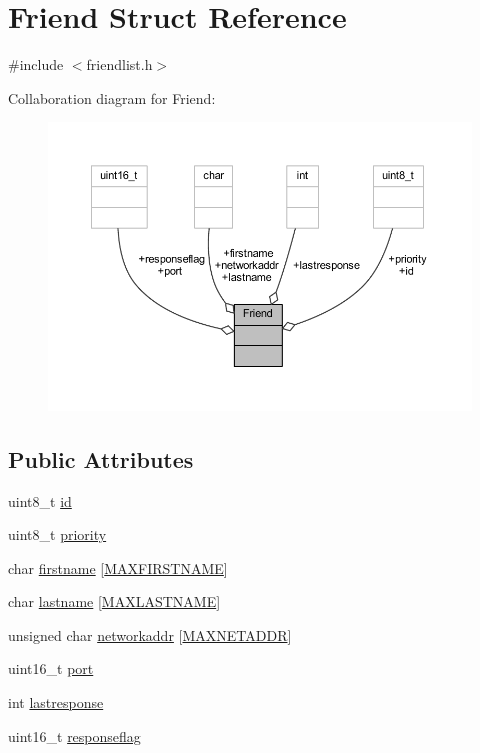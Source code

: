 \hypertarget{struct_friend}{}\section{Friend Struct Reference}
\label{struct_friend}


{\ttfamily \#include $<$friendlist.\+h$>$}



Collaboration diagram for Friend\+:
\nopagebreak
\begin{figure}[H]
\begin{center}
\leavevmode
\includegraphics[width=350pt]{struct_friend__coll__graph}
\end{center}
\end{figure}
\subsection*{Public Attributes}
\begin{DoxyCompactItemize}
\item 
uint8\+\_\+t \hyperlink{struct_friend_a0291dc35d4ff02732e1f2c2300e86a62}{id}
\item 
uint8\+\_\+t \hyperlink{struct_friend_a43c33ac49be70c487897c484beb45d65}{priority}
\item 
char \hyperlink{struct_friend_afd2c18bd56146692ac9ca38183a7a251}{firstname} \mbox{[}\hyperlink{packet_8h_ac3dd1c10edba39fc5737be5b96a91d2a}{M\+A\+X\+F\+I\+R\+S\+T\+N\+A\+ME}\mbox{]}
\item 
char \hyperlink{struct_friend_a8c95ba643a9be7119e74d41184f72eda}{lastname} \mbox{[}\hyperlink{packet_8h_a7c5521a06048b7d49bb5d77b631530e7}{M\+A\+X\+L\+A\+S\+T\+N\+A\+ME}\mbox{]}
\item 
unsigned char \hyperlink{struct_friend_acebbed8a3571a106678927ad4d3ef989}{networkaddr} \mbox{[}\hyperlink{packet_8h_a64e48eb75238bd3d7a053f19071044a8}{M\+A\+X\+N\+E\+T\+A\+D\+DR}\mbox{]}
\item 
uint16\+\_\+t \hyperlink{struct_friend_a783801da9846ad8d6b8f12ff16ac68fb}{port}
\item 
int \hyperlink{struct_friend_a697ca8349120dcda0fcff0a6182ea73b}{lastresponse}
\item 
uint16\+\_\+t \hyperlink{struct_friend_ac42fed371a42091f4b5abce0d3827e3b}{responseflag}
\end{DoxyCompactItemize}


